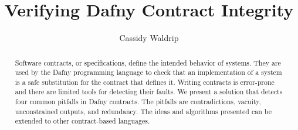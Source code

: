 \documentclass[sigplan,screen,anonymous]{acmart}
\begin{document}
\title{Verifying Dafny Contract Integrity}

\author{Cassidy Waldrip}

\begin{abstract}
Software contracts, or specifications, define the intended behavior of systems. They are used by the Dafny programming language to check that an implementation of a system is a safe substitution for the contract that defines it. Writing contracts is error-prone and there are limited tools for detecting their faults. We present a solution that detects four common pitfalls in Dafny contracts. The pitfalls are contradictions, vacuity, unconstrained outputs, and redundancy. The ideas and algorithms presented can be extended to other contract-based languages.

\end{abstract}

\end{document}
